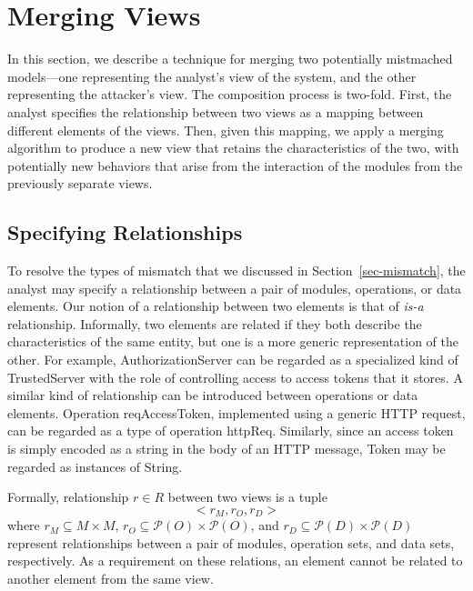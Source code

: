 
\section{Merging Views}
\label{sec-merging}

In this section, we describe a technique for merging two potentially
mistmached models---one representing the analyst's view of the system,
and the other representing the attacker's view. The composition
process is two-fold. First, the analyst specifies the relationship
between two views as a mapping between different elements of the
views. Then, given this mapping, we apply a merging algorithm to
produce a new view that retains the characteristics of the two,
with potentially new behaviors that arise from the interaction of
the modules from the previously separate views.

\subsection{Specifying Relationships}
\label{sec-relationship}

To resolve the types of mismatch that we discussed in
Section~\ref{sec-mismatch}, the analyst may specify a relationship
between a pair of modules, operations, or data elements. 
Our notion of a relationship between two elements is that of
\textit{is-a} relationship. Informally, two elements are related if
they both describe the characteristics of the same entity, but one is
a more generic representation of the other. For example,
\textsf{AuthorizationServer} can be regarded as a specialized kind of
\textsf{TrustedServer} with the role of controlling access to access
tokens that it stores.  A similar kind of relationship can be
introduced between operations or data elements. Operation
\textsf{reqAccessToken}, implemented using a generic HTTP request, can
be regarded as a type of operation \textsf{httpReq}. Similarly,
since an access token is simply encoded as a string in the body of an
HTTP message, \textsf{Token} may be regarded as instances of
\textsf{String}.

Formally, relationship $r \in R$ between two views is a tuple 
\begin{equation*}
<r_{M}, r_{O}, r_{D}>
\end{equation*}
where $r_{M} \subseteq M \times M$, $r_{O} \subseteq \mathcal P (O)
\times \mathcal P (O)$, and $r_{D} \subseteq \mathcal P (D) \times
\mathcal P (D)$ represent relationships between a pair of modules,
operation sets, and data sets, respectively. As a requirement on these
relations, an element cannot be related to another element from the
same view.

